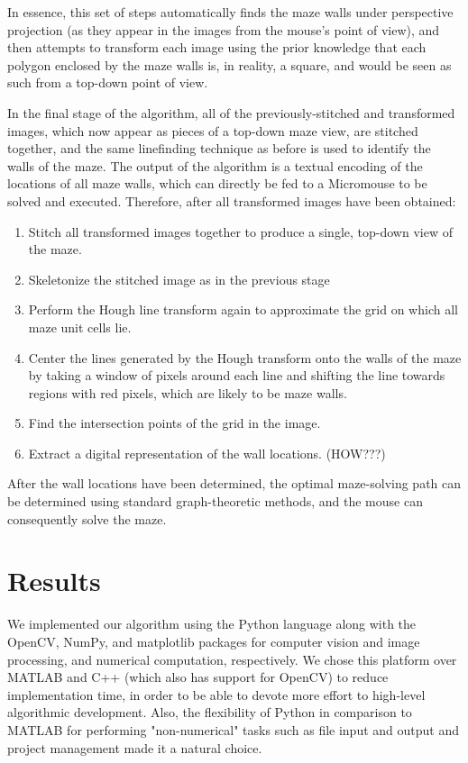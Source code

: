 \documentclass[10pt,twocolumn,letterpaper]{article}
\begin{document}
In essence, this set of steps automatically finds the maze walls under perspective projection (as they appear in the
images from the mouse's point of view), and then attempts to transform each image using the prior knowledge that each
polygon enclosed by the maze walls is, in reality, a square, and would be seen as such from a top-down point of view.

In the final stage of the algorithm, all of the previously-stitched and transformed images, which now appear as pieces
of a top-down maze view, are stitched together, and the same linefinding technique as before is used to identify the
walls of the maze.  The output of the algorithm is a textual encoding of the locations of all maze walls, which can
directly be fed to a Micromouse to be solved and executed.  Therefore, after all transformed images have been obtained:

\begin{enumerate}
	\item Stitch all transformed images together to produce a single, top-down view of the maze.
	\item Skeletonize the stitched image as in the previous stage
	\item Perform the Hough line transform again to approximate the grid on which all maze unit cells lie.
	\item Center the lines generated by the Hough transform onto the walls of the maze by taking a window of pixels
	around each line and shifting the line towards regions with red pixels, which are likely to be maze walls.
	\item Find the intersection points of the grid in the image.
	\item Extract a digital representation of the wall locations. (HOW???)
\end{enumerate}

After the wall locations have been determined, the optimal maze-solving path can be determined using standard 
graph-theoretic methods, and the mouse can consequently solve the maze.

\section{Results}
\label{sec:results}

We implemented our algorithm using the Python language along with the OpenCV, NumPy, and matplotlib packages for
computer vision and image processing, and numerical computation, respectively.  We chose this platform over MATLAB and
C++ (which also has support for OpenCV) to reduce implementation time, in order to be able to devote more effort to
high-level algorithmic development.  Also, the flexibility of Python in comparison to MATLAB for performing 
"non-numerical" tasks such as file input and output and project management made it a natural choice.
\end{document}
